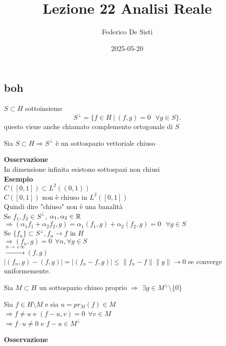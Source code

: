 \documentclass[12px]{article}
\title{Lezione 22 Analisi Reale}
\date{2025-05-20}
\author{Federico De Sisti}
\begin{document}
	\maketitle
	\newpage
	\subsection{boh}
	
	\begin{defi}
		$S\subset H$ sottoinsieme
		 \[
			 S^\perp  = \{f\in H \ | \ (f,g) = 0 \ \ \ \forall g\in S\}
		.\] 
		questo viene anche chiamato complemento ortogonale di $S$
	\end{defi}
	\begin{prop}
		Sia $S\subset H \Rightarrow  S^\perp$ è un sottospazio vettoriale chiuso
	\end{prop}
	\textbf{Osservazione}\\
	In dimensione infinita esistono sottospazi non chiusi\\
	\textbf{Esempio}\\
	$C([0,1])\subset L^2((0,1))$ \\
	$C([0,1])$ non è chiuso in  $L^2([0,1])$\\
	Quindi dire "chiuso" non è una banalità\\
	Se  $f_1, f_2\in S^\perp$, $\alpha_1,\alpha_2\in \mathbb{R}$\\
	$ \Rightarrow  (\alpha_1f_1 + \alpha_2f_2, g ) = \alpha_1(f_1,g) + \alpha_2(f_2,g) = 0 \ \ \ \forall g\in S$ \\
	Se $\{f_n\}\subset S^\perp, f_n \rightarrow f$ in $H$\\
	$ \Rightarrow (f_n,g) =0 \ \ \forall n,\forall g\in S$ \\
	$ \xrightarrow{ n \rightarrow+\infty} (f,g) $\\
	$|(f_n,g) - (f,g)| = |(f_n-f,g)| \leq \|f_n-f\| \|g \|\rightarrow 0$ se converge uniformemente.\\
	\begin{coro}
		Sia $M\subset H$ un sottospazio chiuso proprio  $ \Rightarrow $ $\exists g\in M^\perp\setminus\{0\}$
	\end{coro}
	\begin{dimo}
	Sia $f\in H\setminus M$ e sia  $u = pr_M(f) \in M$\\
	 $ \Rightarrow  f\neq u$ e $(f-u,v) = 0 \ \ \forall v\in M$\\
	  $ \Rightarrow  f\cdot u\neq 0$ e $f -u\in M^\perp$
	\end{dimo}
	\textbf{Osservazione}\\
\end{document}
